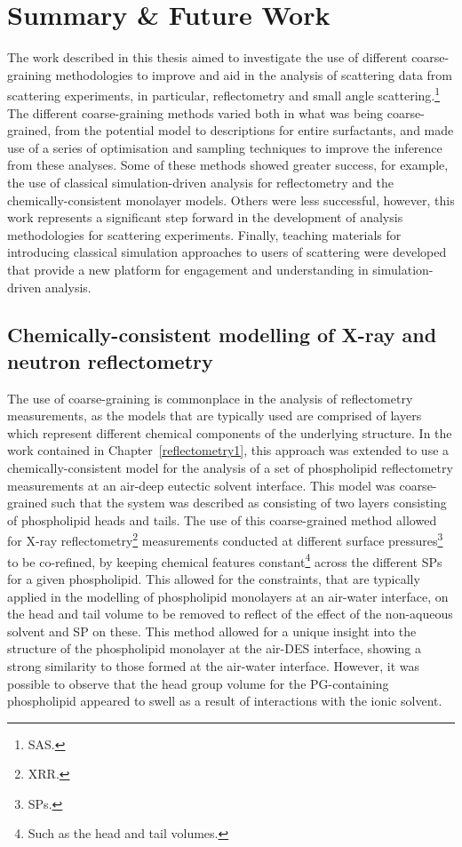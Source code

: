 \chapter{Summary \& Future Work} %
\label{summary} %
The work described in this thesis aimed to investigate the use of different coarse-graining methodologies to improve and aid in the analysis of scattering data from scattering experiments, in particular, reflectometry and small angle scattering.\footnote{SAS.}
The different coarse-graining methods varied both in what was being coarse-grained, from the potential model to descriptions for entire surfactants, and made use of a series of optimisation and sampling techniques to improve the inference from these analyses.
Some of these methods showed greater success, for example, the use of classical simulation-driven analysis for reflectometry and the chemically-consistent monolayer models.
Others were less successful, however, this work represents a significant step forward in the development of analysis methodologies for scattering experiments.
Finally, teaching materials for introducing classical simulation approaches to users of scattering were developed that provide a new platform for engagement and understanding in simulation-driven analysis.

\section{Chemically-consistent modelling of X-ray and neutron reflectometry}
The use of coarse-graining is commonplace in the analysis of reflectometry measurements, as the models that are typically used are comprised of layers which represent different chemical components of the underlying structure.
In the work contained in Chapter~\ref{reflectometry1}, this approach was extended to use a chemically-consistent model for the analysis of a set of phospholipid reflectometry measurements at an air-deep eutectic solvent interface.
This model was coarse-grained such that the system was described as consisting of two layers consisting of phospholipid heads and tails.
The use of this coarse-grained method allowed for X-ray reflectometry\footnote{XRR.} measurements conducted at different surface pressures\footnote{SPs.} to be co-refined, by keeping chemical features constant\footnote{Such as the head and tail volumes.} across the different SPs for a given phospholipid.
This allowed for the constraints, that are typically applied in the modelling of phospholipid monolayers at an air-water interface, on the head and tail volume to be removed to reflect of the effect of the non-aqueous solvent and SP on these.
This method allowed for a unique insight into the structure of the phospholipid monolayer at the air-DES interface, showing a strong similarity to those formed at the air-water interface.
However, it was possible to observe that the head group volume for the PG-containing phospholipid appeared to swell as a result of interactions with the ionic solvent.

